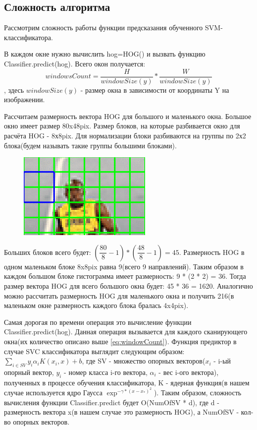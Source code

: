 \subsection{Сложность алгоритма}
Рассмотрим сложность работы функции предсказания обученного SVM-классификатора.

В каждом окне нужно вычислить hog=HOG() и вызвать функцию Classifier.predict(hog). Всего окон получается: 
\begin{equation}
windowsCount = \dfrac{H}{windowSize(y)} * \dfrac{W}{windowSize(y)}
\label{eq:windowCount}
\end{equation}, здесь $windowSize(y)$ - размер окна в зависимости от координаты Y на изображении.

Рассчитаем размерность вектора HOG для большого и маленького окна. Большое окно имеет размер 80x48pix. Размер блоков, на которые разбивается окно для расчёта HOG - 8х8pix. Для нормализации блоки разбиваются на группы по 2х2 блока(будем называть такие группы большими блоками).
\begin{figure}[h!]
	\centering
	\includegraphics[width=0.7\linewidth]{pictures/screenshot02332}
	\caption{}
	\label{fig:screenshot02332}
\end{figure}

Больших блоков всего будет: $(\dfrac{80}{8} - 1)* (\dfrac{48}{8} - 1) = 45$. Размерность HOG в одном маленьком блоке 8x8pix равна 9(всего 9 направлений). Таким образом в каждом большом блоке гистограмма имеет размерность: 9 * (2 * 2) = 36. Тогда размер вектора HOG для всего большого окна будет: 45 * 36 = 1620. Аналогично можно рассчитать размерность HOG для маленького окна и получить 216(в маленьком окне размерность каждого блока бралась 4x4pix).

Самая дорогая по времени операция это вычисление функции Classifier.predict(hog). Данная операция вызывается для каждого сканирующего окна(их количество описано выше \ref{eq:windowCount}). Функция предиктор в случае SVC классификатора выглядит следующим образом: $\sum_{i \in SV} y_i\alpha_i K(x_i, x) + b$, где SV - множество опорных векторов($x_i$ - i-ый опорный вектор, $y_i$ - номер класса i-го вектора, $\alpha_i$ - вес i-ого вектора), полученных в процессе обучения классификатора, K - ядерная функция(в нашем случае используется ядро Гаусса $\exp^{-\gamma*(x-x_*)^2}$). Таким образом, сложность вычисления функции Classifier.predict будет O(NumOfSV * d), где d - размерность вектора x(в нашем случае это размерность HOG), а NumOfSV - кол-во опорных векторов. 

